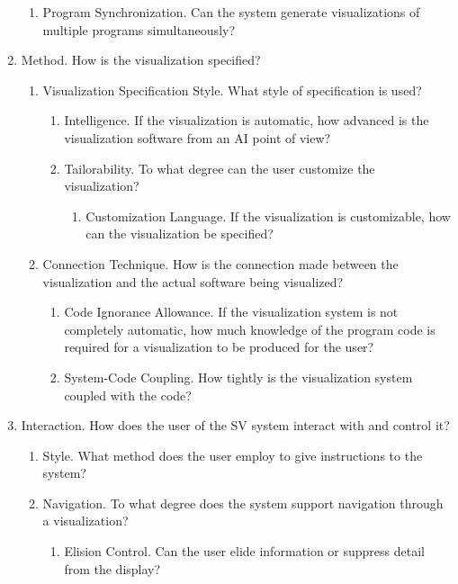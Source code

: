 \begin{enumerate}
\begin{enumerate}
    \item Program Synchronization. Can the system generate visualizations of
    multiple programs simultaneously?
  \end{enumerate}
  \item Method. How is the visualization specified?
  \begin{enumerate}
    \item Visualization Specification Style. What style of specification is
    used?
    \begin{enumerate}
      \item Intelligence. If the visualization is automatic, how advanced is the
      visualization software from an AI point of view?
      \item Tailorability. To what degree can the user customize the
      visualization?
      \begin{enumerate}
        \item Customization Language. If the visualization is customizable, how
        can the visualization be specified?
      \end{enumerate}
    \end{enumerate}
    \item Connection Technique. How is the connection made between the
    visualization and the actual software being visualized?
    \begin{enumerate}
      \item Code Ignorance Allowance. If the visualization system is not
      completely automatic, how much knowledge of the program code is required
      for a visualization to be produced for the user?
      \item System-Code Coupling. How tightly is the visualization system
      coupled with the code?
    \end{enumerate}
  \end{enumerate}
  \item Interaction. How does the user of the SV system interact with and
  control it?
  \begin{enumerate}
    \item Style. What method does the user employ to give instructions to the
    system?
    \item Navigation. To what degree does the system support navigation through
    a visualization?
    \begin{enumerate}
      \item Elision Control. Can the user elide information or suppress detail
      from the display?

\end{enumerate}
\end{enumerate}
\end{enumerate}
